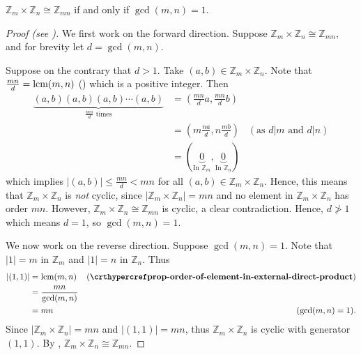 \begin{theorem}\label{thrm-Zm-cross-Zn-isomorphic-to-Zmn-condition}
    $\mathbb{Z}_m \times \mathbb{Z}_n \cong \mathbb{Z}_{mn}$ if and only if $\gcd(m,n) = 1$.
\end{theorem}
\begin{proof}[Proof (see {\cite[Proposition 13.1 (3)]{humphreys_1996}})]
    We first work on the forward direction. Suppose $\mathbb{Z}_m \times \mathbb{Z}_n \cong \mathbb{Z}_{mn}$, and for brevity let $d = \gcd(m,n)$.
    
    Suppose on the contrary that $d > 1$. Take $(a, b) \in \mathbb{Z}_m \times \mathbb{Z}_n$. Note that $\frac{mn}{d} = \mathrm{lcm}(m,n)$ () which is a positive integer. Then
    \begin{align*}
        \underbrace{(a,b)(a,b)(a,b)\cdots(a,b)}_{\frac{mn}{d}\text{ times}} &= \left(\frac{mn}{d}a, \frac{mn}{d}b\right)\\
        &= \left(m\frac{na}{d}, n\frac{mb}{d}\right) & (\text{as } d \vert m \text{ and } d \vert n)\\
        &= (\underbrace{0}_{\text{In } \mathbb{Z}_m}, \underbrace{0}_{\text{In } \mathbb{Z}_n})
    \end{align*}
    which implies $|(a, b)| \leq \frac{mn}{d} < mn$ for all $(a, b) \in \mathbb{Z}_m \times \mathbb{Z}_n$. Hence, this means that $\mathbb{Z}_m \times \mathbb{Z}_n$ is \textit{not} cyclic, since $|\mathbb{Z}_m \times \mathbb{Z}_n| = mn$ and no element in $\mathbb{Z}_m \times \mathbb{Z}_n$ has order $mn$. However, $\mathbb{Z}_m \times \mathbb{Z}_n \cong \mathbb{Z}_{mn}$ is cyclic, a clear contradiction. Hence, $d \not>1$ which means $d = 1$, so $\gcd(m,n) = 1$.

    We now work on the reverse direction. Suppose $\gcd(m,n) = 1$. Note that $|1| = m$ in $\mathbb{Z}_m$ and $|1| = n$ in $\mathbb{Z}_n$. Thus
    \begin{align*}
        |(1, 1)| &= \lcm(m, n) & (\myref{prop-order-of-element-in-external-direct-product})\\
        &= \frac{mn}{\gcd(m,n)}\\
        &= mn & (\gcd(m,n) = 1).
    \end{align*}
    Since $|\mathbb{Z}_m \times \mathbb{Z}_n| = mn$ and $|(1,1)| = mn$, thus $\mathbb{Z}_m \times \mathbb{Z}_n$ is cyclic with generator $(1,1)$. By , $\mathbb{Z}_m \times \mathbb{Z}_n \cong \mathbb{Z}_{mn}$.
\end{proof}

